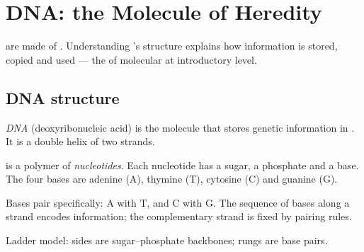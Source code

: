\chapter{DNA: the Molecule of Heredity}\label{ch:g9:dna}

 are made of . Understanding 's structure explains how
information is stored, copied and used --- the  of molecular
 at introductory level.

\section{DNA structure}

\begin{definition}[DNA]\label{def:g9:dna:dna}
\emph{DNA} (deoxyribonucleic acid) is the molecule that stores
genetic information in . It is a double helix of two strands.
\end{definition}


\begin{definition}\label{def:g9:dna:base}
 is a polymer of \emph{nucleotides}. Each nucleotide
has a sugar, a phosphate and a base. The four bases are adenine (A),
thymine (T), cytosine (C) and guanine (G).
\end{definition}

\begin{proposition}\label{prop:g9:dna:pair}
Bases pair specifically: A with T, and C with G. The sequence of bases
along a strand encodes information; the complementary strand is fixed by
pairing rules.
\end{proposition}
\admitted

\begin{omfigure}

{\small Ladder model: sides are sugar--phosphate backbones; rungs are base
pairs.}
\end{omfigure}

